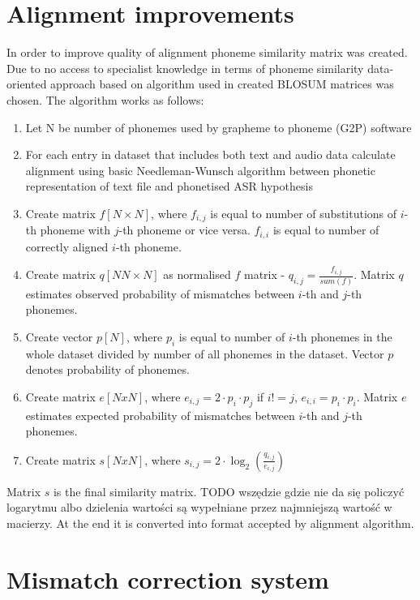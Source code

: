 \documentclass[a4paper,11pt,twoside]{report}
\theoremstyle{definition}
\begin{document}
\section{Alignment improvements}

In order to improve quality of alignment phoneme similarity matrix was created. Due to no access to specialist knowledge in terms of phoneme similarity data-oriented approach based on algorithm used in created BLOSUM matrices was chosen. The algorithm works as follows:
\begin{enumerate}
    \item Let N be number of phonemes used by grapheme to phoneme (G2P) software
    \item For each entry in dataset that includes both text and audio data calculate alignment using basic Needleman-Wunsch algorithm between phonetic representation of text file and phonetised ASR hypothesis
    \item Create matrix $f[N \times N]$, where $f_{i,j}$ is equal to number of substitutions of $i$-th phoneme with $j$-th phoneme or vice versa. $f_{i,i}$ is equal to number of correctly aligned $i$-th phoneme.
    \item Create matrix $q[NN \times N]$ as normalised $f$ matrix - $q_{i,j} = \frac{f_{i,j}}{sum(f)}$. Matrix $q$ estimates observed probability of mismatches between $i$-th and $j$-th phonemes.
    \item Create vector $p[N]$, where $p_i$ is equal to number of $i$-th phonemes in the whole dataset divided by number of all phonemes in the dataset. Vector $p$ denotes probability of phonemes.
    \item Create matrix $e[NxN]$, where $e_{i,j}=2 \cdot p_i \cdot p_j$ if $i!=j$, $e_{i,i}=p_i \cdot p_i$. Matrix $e$ estimates expected probability of mismatches between $i$-th and $j$-th phonemes.
    \item Create matrix $s[NxN]$, where $s_{i,j} = 2 \cdot \log_2 \left( \frac{q_{i,j}}{e_{i,j}} \right)$
\end{enumerate}

Matrix $s$ is the final similarity matrix. TODO wszędzie gdzie nie da się policzyć logarytmu albo dzielenia wartości są wypełniane przez najmniejszą wartość w macierzy.
At the end it is converted into format accepted by alignment algorithm.

\section{Mismatch correction system}
\end{document}
